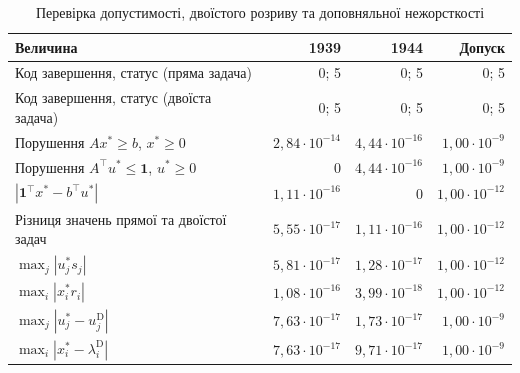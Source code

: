 \begin{table}[htbp]
\centering\small
\caption{Перевірка допустимості, двоїстого розриву та доповняльної нежорсткості}
\label{tab:glpk-checks}
\begin{tabular}{lrrr}
\toprule
Величина & 1939 & 1944 & Допуск \\
\midrule
Код завершення, статус (пряма задача) & 0; 5 & 0; 5 & 0; 5 \\
Код завершення, статус (двоїста задача) & 0; 5 & 0; 5 & 0; 5 \\
Порушення $Ax^*\ge b$, $x^*\ge0$ & $2{,}84\cdot10^{-14}$ & $4{,}44\cdot10^{-16}$ & $1{,}00\cdot10^{-9}$ \\
Порушення $A^\top u^*\le\mathbf1$, $u^*\ge0$ & $0$ & $4{,}44\cdot10^{-16}$ & $1{,}00\cdot10^{-9}$ \\
$|\mathbf1^\top x^*-b^\top u^*|$ & $1{,}11\cdot10^{-16}$ & $0$ & $1{,}00\cdot10^{-12}$ \\
Різниця значень прямої та двоїстої задач & $5{,}55\cdot10^{-17}$ & $1{,}11\cdot10^{-16}$ & $1{,}00\cdot10^{-12}$ \\
$\max_j|u_j^*s_j|$ & $5{,}81\cdot10^{-17}$ & $1{,}28\cdot10^{-17}$ & $1{,}00\cdot10^{-12}$ \\
$\max_i|x_i^*r_i|$ & $1{,}08\cdot10^{-16}$ & $3{,}99\cdot10^{-18}$ & $1{,}00\cdot10^{-12}$ \\
$\max_j|u_j^*-u_j^{\mathrm{D}}|$ & $7{,}63\cdot10^{-17}$ & $1{,}73\cdot10^{-17}$ & $1{,}00\cdot10^{-9}$ \\
$\max_i|x_i^*-\lambda_i^{\mathrm{D}}|$ & $7{,}63\cdot10^{-17}$ & $9{,}71\cdot10^{-17}$ & $1{,}00\cdot10^{-9}$ \\
\bottomrule
\end{tabular}
\end{table}
